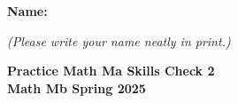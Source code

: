\documentclass{article}
\begin{document}
 

 \noindent
{\large \mbox{} \hfill \bf Name:\underline{\hspace{3in}}}

 {\mbox{} \hfill \it (Please write your name neatly in print.)}


 
\medskip
 
\noindent
{\large\bf
Practice Math Ma Skills Check 2\\ Math Mb Spring 2025}
\noindent

\end{document}
